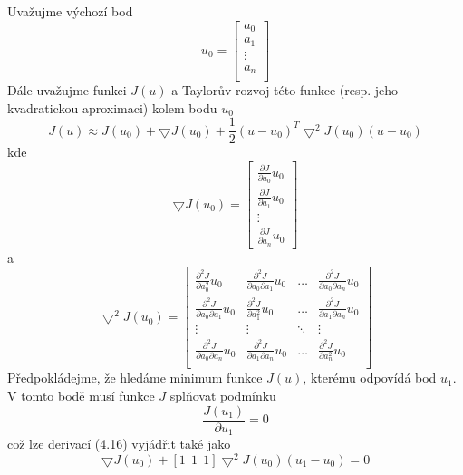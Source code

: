 \documentclass[a4paper]{book}
\begin{document}
Uvažujme výchozí bod
\begin{equation*}
u_0 =
\begin{bmatrix}
a_0 \\
a_1 \\
\vdots \\
a_n \\
\end{bmatrix}
\end{equation*}
Dále uvažujme funkci $J(u)$ a Taylorův rozvoj této funkce (resp. jeho kvadratickou aproximaci) kolem bodu $u_0$
\begin{equation}
J(u) \approx J(u_0) + \bigtriangledown J(u_0) + \frac{1}{2}(u - u_0)^T \bigtriangledown^2 J(u_0)(u - u_0)
\end{equation}
kde
\begin{equation*}
\bigtriangledown J(u_0) =
\begin{bmatrix}
\frac{\partial J}{\partial a_0}u_0 \\
\frac{\partial J}{\partial a_1}u_0 \\
\vdots \\
\frac{\partial J}{\partial a_n}u_0
\end{bmatrix}
\end{equation*}
a
\begin{equation*}
\bigtriangledown^2 J(u_0) =
\begin{bmatrix}
\frac{\partial^2 J}{\partial a_0^2}u_0 & \frac{\partial^2 J}{\partial a_0 \partial a_1}u_0 & \dots & \frac{\partial^2 J}{\partial a_0 \partial a_n}u_0 \\
\frac{\partial^2 J}{\partial a_0 \partial a_1}u_0 & \frac{\partial^2 J}{\partial a_1^2}u_0 & \dots & \frac{\partial^2 J}{\partial a_1 \partial a_n}u_0 \\
\vdots & \vdots & \ddots & \vdots \\
\frac{\partial^2 J}{\partial a_0 \partial a_n}u_0 & \frac{\partial^2 J}{\partial a_1 \partial a_n}u_0 & \dots & \frac{\partial^2 J}{\partial a_n^2}u_0 \\
\end{bmatrix}
\end{equation*}
Předpokládejme, že hledáme minimum funkce $J(u)$, kterému odpovídá bod $u_1$. V tomto bodě musí funkce $J$ splňovat podmínku
\begin{equation*}
\frac{J(u_1)}{\partial u_1} = 0
\end{equation*}
což lze derivací (4.16) vyjádřit také jako
\begin{equation}
[1~~1~~1] \bigtriangledown J(u_0) + [1~~1~~1] \bigtriangledown^2 J(u_0)(u_1 - u_0) = 0
\end{equation}
\end{document}
